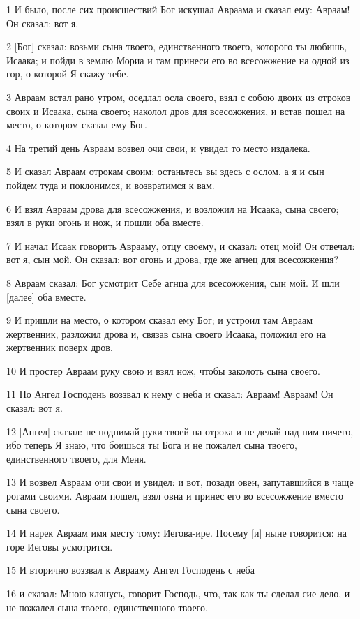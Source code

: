 \par 1 И было, после сих происшествий Бог искушал Авраама и сказал ему: Авраам! Он сказал: вот я.
\par 2 [Бог] сказал: возьми сына твоего, единственного твоего, которого ты любишь, Исаака; и пойди в землю Мориа и там принеси его во всесожжение на одной из гор, о которой Я скажу тебе.
\par 3 Авраам встал рано утром, оседлал осла своего, взял с собою двоих из отроков своих и Исаака, сына своего; наколол дров для всесожжения, и встав пошел на место, о котором сказал ему Бог.
\par 4 На третий день Авраам возвел очи свои, и увидел то место издалека.
\par 5 И сказал Авраам отрокам своим: останьтесь вы здесь с ослом, а я и сын пойдем туда и поклонимся, и возвратимся к вам.
\par 6 И взял Авраам дрова для всесожжения, и возложил на Исаака, сына своего; взял в руки огонь и нож, и пошли оба вместе.
\par 7 И начал Исаак говорить Аврааму, отцу своему, и сказал: отец мой! Он отвечал: вот я, сын мой. Он сказал: вот огонь и дрова, где же агнец для всесожжения?
\par 8 Авраам сказал: Бог усмотрит Себе агнца для всесожжения, сын мой. И шли [далее] оба вместе.
\par 9 И пришли на место, о котором сказал ему Бог; и устроил там Авраам жертвенник, разложил дрова и, связав сына своего Исаака, положил его на жертвенник поверх дров.
\par 10 И простер Авраам руку свою и взял нож, чтобы заколоть сына своего.
\par 11 Но Ангел Господень воззвал к нему с неба и сказал: Авраам! Авраам! Он сказал: вот я.
\par 12 [Ангел] сказал: не поднимай руки твоей на отрока и не делай над ним ничего, ибо теперь Я знаю, что боишься ты Бога и не пожалел сына твоего, единственного твоего, для Меня.
\par 13 И возвел Авраам очи свои и увидел: и вот, позади овен, запутавшийся в чаще рогами своими. Авраам пошел, взял овна и принес его во всесожжение вместо сына своего.
\par 14 И нарек Авраам имя месту тому: Иегова-ире. Посему [и] ныне говорится: на горе Иеговы усмотрится.
\par 15 И вторично воззвал к Аврааму Ангел Господень с неба
\par 16 и сказал: Мною клянусь, говорит Господь, что, так как ты сделал сие дело, и не пожалел сына твоего, единственного твоего,
